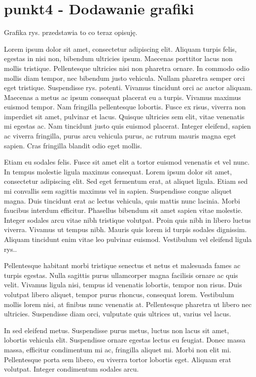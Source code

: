 \chapter{punkt4 - Dodawanie grafiki}

Grafika rys. przedstawia to co teraz opisuję.

Lorem ipsum dolor sit amet, consectetur adipiscing elit. Aliquam turpis felis, egestas in nisi non, bibendum ultricies ipsum. Maecenas porttitor lacus non mollis tristique. Pellentesque ultricies nisi non pharetra ornare. In commodo odio mollis diam tempor, nec bibendum justo vehicula. Nullam pharetra semper orci eget tristique. Suspendisse rys. potenti. 
Vivamus tincidunt orci ac auctor aliquam. Maecenas a metus ac ipsum consequat placerat eu a turpis. Vivamus maximus euismod tempor. Nam fringilla pellentesque lobortis. Fusce ex risus, viverra non imperdiet sit amet, pulvinar et lacus. Quisque ultricies sem elit, vitae venenatis mi egestas ac. Nam tincidunt justo quis euismod placerat. Integer eleifend, sapien ac viverra fringilla, purus arcu vehicula purus, ac rutrum mauris magna eget sapien. Cras fringilla blandit odio eget mollis.

Etiam eu sodales felis. Fusce sit amet elit a tortor euismod venenatis et vel nunc. In tempus molestie ligula maximus consequat. Lorem ipsum dolor sit amet, consectetur adipiscing elit. Sed eget fermentum erat, at aliquet ligula. Etiam sed mi convallis sem sagittis maximus vel in sapien. Suspendisse congue aliquet magna. Duis tincidunt erat ac lectus vehicula, quis mattis nunc lacinia. Morbi faucibus interdum efficitur. Phasellus bibendum sit amet sapien vitae molestie. Integer sodales arcu vitae nibh tristique volutpat. Proin quis nibh in libero luctus viverra. Vivamus ut tempus nibh. Mauris quis lorem id turpis sodales dignissim. Aliquam tincidunt enim vitae leo pulvinar euismod. Vestibulum vel eleifend ligula rys..

Pellentesque habitant morbi tristique senectus et netus et malesuada fames ac turpis egestas. Nulla sagittis purus ullamcorper magna facilisis ornare ac quis velit. Vivamus ligula nisi, tempus id venenatis lobortis, tempor non risus. Duis volutpat libero aliquet, tempor purus rhoncus, consequat lorem. Vestibulum mollis lorem nisi, at finibus nunc venenatis at. Pellentesque pharetra ut libero nec ultricies. Suspendisse diam orci, vulputate quis ultrices ut, varius vel lacus.

In sed eleifend metus. Suspendisse purus metus, luctus non lacus sit amet, lobortis vehicula elit. Suspendisse ornare egestas lectus eu feugiat. Donec massa massa, efficitur condimentum mi ac, fringilla aliquet mi. Morbi non elit mi. Pellentesque porta sem libero, eu viverra tortor lobortis eget. Aliquam erat volutpat. Integer condimentum sodales arcu.